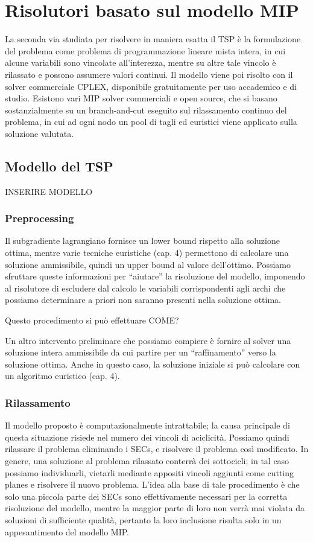 \chapter{Risolutori basato sul modello MIP}
La seconda via studiata per risolvere in maniera esatta il TSP è la formulazione del problema come problema di programmazione lineare mista intera, in cui alcune variabili sono vincolate all'interezza, mentre su altre tale vincolo è rilassato e possono assumere valori continui. Il modello viene poi risolto con il solver commerciale CPLEX, disponibile gratuitamente per uso accademico e di studio. Esistono vari MIP solver commerciali e open source, che si basano sostanzialmente su un branch-and-cut eseguito sul rilassamento continuo del problema, in cui ad ogni nodo un pool di tagli ed euristici viene applicato sulla soluzione valutata.

\section{Modello del TSP}
INSERIRE MODELLO

\subsection{Preprocessing}
Il subgradiente lagrangiano fornisce un lower bound rispetto alla soluzione ottima, mentre varie tecniche euristiche (cap. 4) permettono di calcolare una soluzione ammissibile, quindi un upper bound al valore dell'ottimo. Possiamo sfruttare queste informazioni per ``aiutare'' la risoluzione del modello, imponendo al risolutore di escludere dal calcolo le variabili corrispondenti agli archi che possiamo determinare a priori non saranno presenti nella soluzione ottima.

Questo procedimento si può effettuare COME?

Un altro intervento preliminare che possiamo compiere è fornire al solver una soluzione intera ammissibile da cui partire per un ``raffinamento'' verso la soluzione ottima. Anche in questo caso, la soluzione iniziale si può calcolare con un algoritmo euristico (cap. 4).

\subsection{Rilassamento}\label{sec:relaxelsecs}
Il modello proposto è computazionalmente intrattabile; la causa principale di questa situazione risiede nel numero dei vincoli di aciclicità. Possiamo quindi rilassare il problema eliminando i SECs, e risolvere il problema così modificato. In genere, una soluzione al problema rilassato conterrà dei sottocicli; in tal caso possiamo individuarli, vietarli mediante appositi vincoli aggiunti come cutting planes e risolvere il nuovo problema. L'idea alla base di tale procedimento è che solo una piccola parte dei SECs sono effettivamente necessari per la corretta risoluzione del modello, mentre la maggior parte di loro non verrà mai violata da soluzioni di sufficiente qualità, pertanto la loro inclusione risulta solo in un appesantimento del modello MIP.

